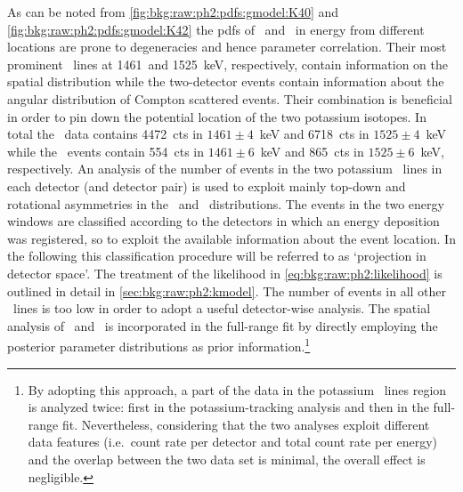As can be noted from \cref{fig:bkg:raw:ph2:pdfs:gmodel:K40} and
\cref{fig:bkg:raw:ph2:pdfs:gmodel:K42} the pdfs of \kvn\ and \kvz\ in energy from
different locations are prone to degeneracies and hence parameter correlation. Their most
prominent \g\ lines at 1461~and 1525~keV, respectively, contain information on the spatial
distribution while the two-detector events contain information about the angular
distribution of Compton scattered events. Their combination is beneficial in order to pin
down the potential location of the two potassium isotopes. In total the \Mone\ data
contains 4472~cts in $1461 \pm 4$~keV and 6718~cts in $1525 \pm 4$~keV while the \Mtwo\
events contain 554~cts in $1461 \pm 6$~keV and 865~cts in $1525 \pm 6$~keV, respectively.
An analysis of the number of events in the two potassium \g\ lines in each detector (and
detector pair) is used to exploit mainly top-down and rotational asymmetries in the \kvn\
and \kvz\ distributions. The events in the two energy windows are classified according to
the detectors in which an energy deposition was registered, so to exploit the available
information about the event location. In the following this classification procedure will
be referred to as `projection in detector space'. The treatment of the likelihood
in \cref{eq:bkg:raw:ph2:likelihood} is outlined in detail in
\cref{sec:bkg:raw:ph2:kmodel}.  The number of events in all other \g\ lines is too low in
order to adopt a useful detector-wise analysis. The spatial analysis of \kvn\ and \kvz\ is
incorporated in the full-range fit by directly employing the posterior parameter
distributions as prior information.\footnote{%
  By adopting this approach, a part of the data in the potassium \g\ lines region is
  analyzed twice: first in the potassium-tracking analysis and then in the full-range fit.
  Nevertheless, considering that the two analyses exploit different data features
  (i.e.~count rate per detector and total count rate per energy) and the overlap between
  the two data set is minimal, the overall effect is negligible.
}


